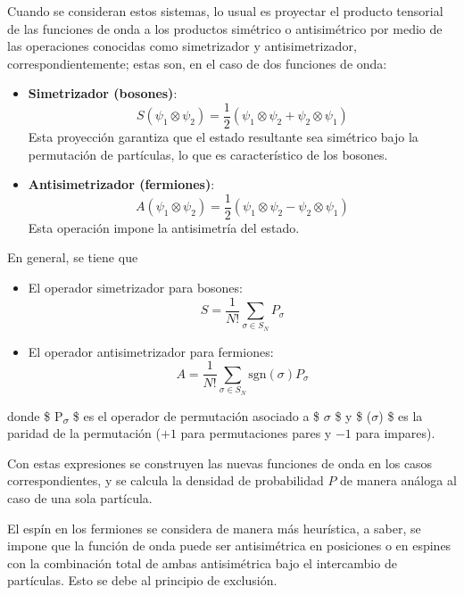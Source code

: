 \documentclass[11pt]{article}
\begin{document}
Cuando se consideran estos sistemas, lo usual es proyectar el producto tensorial
de las funciones de onda a los productos simétrico o antisimétrico por medio de
las operaciones conocidas como simetrizador y antisimetrizador,
correspondientemente; estas son, en el caso de dos funciones de onda:
\begin{itemize}
\item \textbf{Simetrizador (bosones)}:
$$
  S(\psi_1 \otimes \psi_2) = \frac{1}{2} (\psi_1 \otimes \psi_2 + \psi_2 \otimes \psi_1)
  $$
Esta proyección garantiza que el estado resultante sea simétrico bajo la
permutación de partículas, lo que es característico de los bosones.

\item \textbf{Antisimetrizador (fermiones)}:
$$
  A(\psi_1 \otimes \psi_2) = \frac{1}{2} (\psi_1 \otimes \psi_2 - \psi_2 \otimes \psi_1)
  $$
Esta operación impone la antisimetría del estado.
\end{itemize}

En general, se tiene que
\begin{itemize}
\item El operador simetrizador para bosones:
$$
  S = \frac{1}{N!} \sum_{\sigma \in S_N} P_\sigma
  $$
\item El operador antisimetrizador para fermiones:
$$
  A = \frac{1}{N!} \sum_{\sigma \in S_N} \text{sgn}(\sigma) P_\sigma
  $$
\end{itemize}
donde \$ P\textsubscript{\(\sigma\)} \$ es el operador de permutación asociado a \$ \(\sigma\) \$ y
\$ (\(\sigma\)) \$ es la paridad de la permutación (\(+1\) para
permutaciones pares y \(-1\) para impares).

Con estas expresiones se construyen las nuevas funciones de onda en los casos
correspondientes, y se calcula la densidad de probabilidad \(P\) de manera análoga al caso de una sola partícula.

El espín en los fermiones se considera de manera más heurística, a saber, se
impone que la función de onda puede ser antisimétrica en posiciones o en espines
con la combinación total de ambas antisimétrica bajo el intercambio de
partículas. Esto se debe al principio de exclusión.
\end{document}
